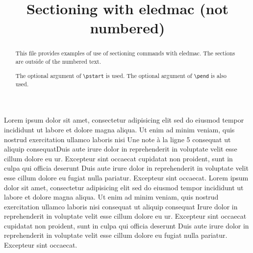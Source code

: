 \documentclass{article}
\begin{document}
\begin{english}
\date{}
\title{Sectioning with eledmac (not numbered)}
\maketitle
\begin{abstract}
This file provides examples of use of sectioning commands with eledmac.
The sections are outside of the numbered text. 

The optional argument of \verb+\pstart+ is used. The optional argument of \verb+\pend+ is also used.
\end{abstract}
\end{english}

\beginnumbering
{}
Lorem ipsum dolor sit amet, consectetur adipisicing elit
sed do eiusmod tempor incididunt ut labore et dolore
magna aliqua. Ut enim ad minim veniam, quis nostrud
exercitation ullamco laboris nisi
Une note à la ligne 5 consequat ut aliquip consequat\pend[\vskip 2ex]
Duis aute irure dolor in reprehenderit
in voluptate velit esse cillum dolore eu ur. Excepteur sint occaecat
cupidatat non proident, sunt in culpa qui officia deserunt
Duis aute irure dolor in reprehenderit
in voluptate velit esse cillum dolore eu fugiat nulla
pariatur. Excepteur sint occaecat.
\pend[]
Lorem ipsum dolor sit amet, consectetur adipisicing elit
sed do eiusmod tempor incididunt ut labore et dolore
magna aliqua. Ut enim ad minim veniam, quis nostrud
exercitation ullamco laboris nisi
 consequat ut aliquip consequat
Irure dolor in reprehenderit
in voluptate velit esse cillum dolore eu ur. Excepteur sint occaecat
cupidatat non proident, sunt in culpa qui officia deserunt
Duis aute irure dolor in reprehenderit
in voluptate velit esse cillum dolore eu fugiat nulla
pariatur. Excepteur sint occaecat.
\pend
\endnumbering
\end{document}
